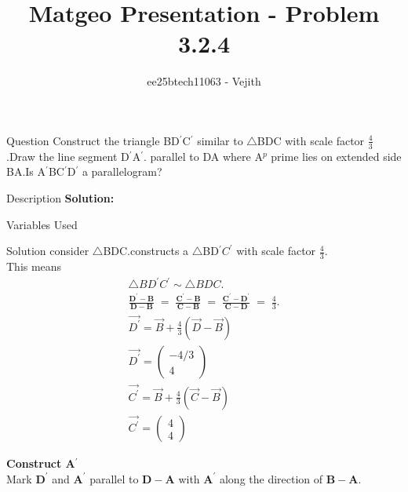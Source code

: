 \documentclass{beamer}
\title{Matgeo Presentation - Problem 3.2.4}
\author{ee25btech11063 - Vejith}
\numberwithin{equation}{section}
\theoremstyle{remark}
\newcommand{\myvec}[1]{\ensuremath{\begin{pmatrix}#1\end{pmatrix}}}
\let\vec\mathbf
\begin{document}
\frame{\titlepage}
\begin{frame}{Question}
Construct the triangle BD$^{\prime}$C$^{\prime}$ similar to $\triangle$BDC with scale factor $\frac{4}{3}$.Draw the line segment D$^{\prime}$A$^{\prime}$. parallel to DA where A$^p$ prime lies on extended side BA.Is A$^{\prime}$BC$^{\prime}$D$^{\prime}$ a parallelogram?
\end{frame}

\begin{frame}{Description}
\textbf{Solution: }\\
\begin{table}[h!]    
  \centering
  
  \caption{Variables Used}
  \label{}
\end{table}
\end{frame}

\begin{frame}{Solution}
consider $\triangle$BDC.constructs a $\triangle$BD$^{\prime}C^{\prime}$
 with scale factor $\frac{4}{3}$.\\
This means 
\begin{align}
  \triangle BD^{\prime}C^{\prime} \sim \triangle BDC.\\
\frac{\vec{D^{\prime}}-\vec{B}}{\vec{D}-\vec{B}} \;=\; \frac{\vec{C^{\prime}}-\vec{B}}{\vec{C}-\vec{B}} \;=\; \frac{\vec{C^{\prime}}-\vec{D^{\prime}}}{\vec{C}-\vec{D}} \;=\; \frac{4}{3}.\\
\Vec{D^{\prime}}=\Vec{B}+\frac{4}{3}(\Vec{D}-\Vec{B})\\
\Vec{D^{\prime}}=\myvec{-4/3\\4}\\
\Vec{C^{\prime}}=\Vec{B}+\frac{4}{3}(\Vec{C}-\Vec{B})\\
\Vec{C^{\prime}}=\myvec{4\\4}
\end{align}

\textbf{Construct A$^{\prime}$}\\
Mark $\vec{D^{\prime}}$ and $\vec{A^{\prime}}$ parallel to $\vec{D}-\vec{A}$ with $\vec{A^{\prime}}$ along the direction of  $\vec{B}-\vec{A}$.\\
\end{frame}
\end{document}
